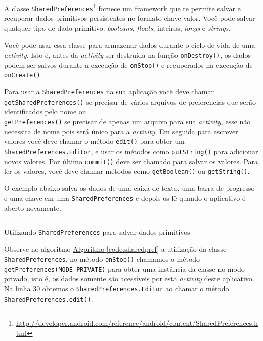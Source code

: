 \documentclass[a4paper,12pt,brazil,oneside]{book}
\begin{document}
		A classe \texttt{SharedPreferences}\footnote{\href{http://developer.android.com/reference/android/content/SharedPreferences.html}{http://developer.android.com/reference/android/content/SharedPreferences.html}} fornece um framework que te permite salvar e recuperar dados primitivos persistentes no formato chave-valor. Você pode salvar qualquer tipo de dado primitivo: \emph{booleans}, \emph{floats}, inteiros, \emph{longs} e \emph{strings}.
 
		Você pode usar essa classe para armazenar dados durante o ciclo de vida de uma \emph{activity}. Isto é, antes da \emph{activity} ser destruída na função \texttt{onDestroy()}, os dados podem ser salvos durante a execução de \texttt{onStop()} e recuperados na execução de \texttt{onCreate()}.

		Para usar a \texttt{SharedPreferences} na sua aplicação você deve chamar \\ \texttt{getSharedPreferences()} se precisar de vários arquivos de preferencias que serão identificados pelo nome ou \\ \texttt{getPreferences()} se precisar de apenas um arquivo para sua \emph{activity}, esse não necessita de nome pois será único para a \emph{activity}. Em seguida para escrever valores você deve chamar o método \texttt{edit()} para obter um \texttt{SharedPreferences.Editor}, e usar os métodos como \texttt{putString()} para adicionar novos valores. Por último \texttt{commit()} deve ser chamado para salvar os valores. Para ler os valores, você deve chamar métodos como \texttt{getBoolean()} ou \texttt{getString()}.

		O exemplo abaixo salva os dados de uma caixa de texto, uma barra de progresso e uma chave em uma \texttt{SharedPreferences} e depois os lê quando o aplicativo é aberto novamente.

		\begin{listing}[H]
		\inputminted[linenos=true,fontsize=\small,frame=lines, framesep=2mm, tabsize=2,numbersep=5pt]{java}{src/api/storage/sharedpref.java}
		\caption{Utilizando \texttt{SharedPreferences} para salvar dados primitivos}
		\label{code:sharedpref}
		\end{listing} 	
		
		Observe no algoritmo \hyperref[code:sharedpref]{Algoritmo \ref*{code:sharedpref}} a utilização da classe \texttt{SharedPreferences}, no método \texttt{onStop()} chamamos o método \texttt{getPreferences(MODE\_PRIVATE)} para obter uma instância da classe no modo privado, isto é, os dados somente são acessíveis por esta \emph{activity} deste aplicativo. Na linha 30 obtemos o \texttt{SharedPreferences.Editor} ao chamar o método \texttt{SharedPreferences.edit()}.
		
\end{document}
